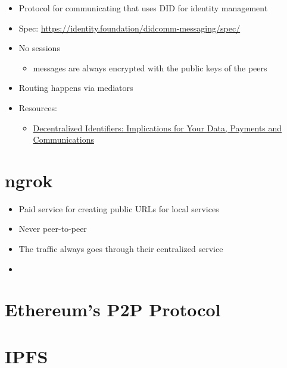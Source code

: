 \begin{itemize}
\tightlist
\item
  Protocol for communicating that uses DID for identity management
\item
  Spec: \url{https://identity.foundation/didcomm-messaging/spec/}
\item
  No sessions

  \begin{itemize}
  \tightlist
  \item
    messages are always encrypted with the public keys of the peers
  \end{itemize}
\item
  Routing happens via mediators
\item
  Resources:

  \begin{itemize}
  \tightlist
  \item
    \href{https://newsletter.impervious.ai/decentralized-identifiers-implications-for-your-data-payments-and-communications-2/}{Decentralized Identifiers: Implications for Your Data, Payments and Communications}
  \end{itemize}
\end{itemize}

\label{notes__02100-ngrok.md}
\section{ngrok}\label{notes__02100-ngrok.md__ngrok}

\begin{itemize}
\tightlist
\item
  Paid service for creating public URLs for local services
\item
  Never peer-to-peer
\item
  The traffic always goes through their centralized service
\item
\end{itemize}

\label{notes__02110-ethereum.md}
\section{Ethereum's P2P Protocol}\label{notes__02110-ethereum.md__ethereums-p2p-protocol}

\label{notes__02120-ipfs.md}
\section{IPFS}\label{notes__02120-ipfs.md__ipfs}

